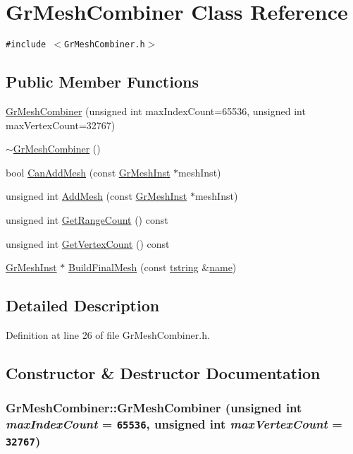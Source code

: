 \hypertarget{class_gr_mesh_combiner}{
\section{GrMeshCombiner Class Reference}
\label{class_gr_mesh_combiner}
}
{\tt \#include $<$GrMeshCombiner.h$>$}

\subsection*{Public Member Functions}
\begin{CompactItemize}
\item 
\hyperlink{class_gr_mesh_combiner_f3db6fcdfe186371c14c8a175081392b}{GrMeshCombiner} (unsigned int maxIndexCount=65536, unsigned int maxVertexCount=32767)
\item 
\hyperlink{class_gr_mesh_combiner_58fea974a680d1ce4b5038138d92db61}{$\sim$GrMeshCombiner} ()
\item 
bool \hyperlink{class_gr_mesh_combiner_1291e59a1c23b3cc1204b48a8728ad1f}{CanAddMesh} (const \hyperlink{class_gr_mesh_inst}{GrMeshInst} $\ast$meshInst)
\item 
unsigned int \hyperlink{class_gr_mesh_combiner_35a035d950b95e8a291fe2e333bb4e8a}{AddMesh} (const \hyperlink{class_gr_mesh_inst}{GrMeshInst} $\ast$meshInst)
\item 
unsigned int \hyperlink{class_gr_mesh_combiner_1d2955c0b2ff844c687ec467a713e1bd}{GetRangeCount} () const 
\item 
unsigned int \hyperlink{class_gr_mesh_combiner_f5879bfc1bcd54c7e5ce7e7d73a3f4f5}{GetVertexCount} () const 
\item 
\hyperlink{class_gr_mesh_inst}{GrMeshInst} $\ast$ \hyperlink{class_gr_mesh_combiner_ec10305f0381d0eea825e5352bd48874}{BuildFinalMesh} (const \hyperlink{common__afx_8h_816fa58fd77499b0edb2c69ebe803d5c}{tstring} \&\hyperlink{glext__bak_8h_bb62efe59ccdd153ce42e1a418352209}{name})
\end{CompactItemize}


\subsection{Detailed Description}


Definition at line 26 of file GrMeshCombiner.h.

\subsection{Constructor \& Destructor Documentation}
\hypertarget{class_gr_mesh_combiner_f3db6fcdfe186371c14c8a175081392b}{
\subsubsection[{GrMeshCombiner}]{\setlength{\rightskip}{0pt plus 5cm}GrMeshCombiner::GrMeshCombiner (unsigned int {\em maxIndexCount} = {\tt 65536}, \/  unsigned int {\em maxVertexCount} = {\tt 32767})}}
\label{class_gr_mesh_combiner_f3db6fcdfe186371c14c8a175081392b}




